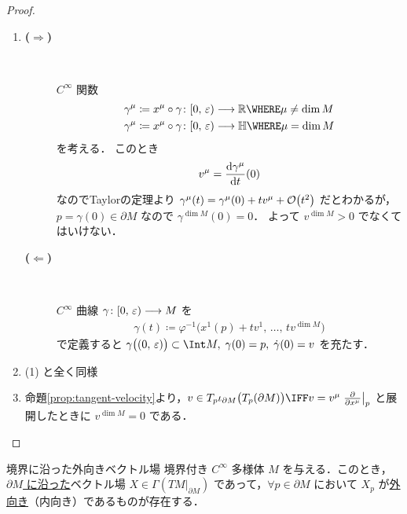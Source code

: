 \documentclass[geometry_main]{subfiles}
\begin{document}
\begin{proof}
	\begin{enumerate}
		\item 
		\begin{description}
			\item[\textbf{($\bm{\Longrightarrow}$)}]　
			
			$C^\infty$ 関数
			\begin{align}
				\gamma^\mu &\coloneqq x^\mu \circ \gamma \colon [0,\, \varepsilon) \lto \mathbb{R} \WHERE \mu \neq \dim M \\
				\gamma^\mu &\coloneqq x^\mu \circ \gamma \colon [0,\, \varepsilon) \lto \mathbb{H} \WHERE \mu = \dim M
			\end{align}
			を考える．
			このとき
			\begin{align}
				v^{\mu} = \dv{\gamma^{\mu}}{t}()(0)
			\end{align}
			なのでTaylorの定理より $\gamma^\mu(t) = \gamma^\mu (0) + tv^\mu + \order{t^2}$ だとわかるが，$p = \gamma(0)\in \partial M$ なので $\gamma^{\dim M}(0) = 0$．
			よって $v^{\dim M} > 0$ でなくてはいけない．

			\item[\textbf{($\bm{\Longleftarrow}$)}]　
			
			$C^\infty$ 曲線 $\gamma \colon [0,\, \varepsilon) \longrightarrow M$ を
			\begin{align}
				\gamma(t) \coloneqq \varphi^{-1} \bigl( x^1(p) + tv^1,\, \dots,\, tv^{\dim M} \bigr) 
			\end{align}
			で定義すると $\gamma \bigl( (0,\, \varepsilon) \bigr) \subset \Int M,\; \gamma(0) = p,\; \dot{\gamma}(0) = v$ を充たす．
		\end{description}

		\item (1) と全く同様
		
		\item 
		命題\ref{prop:tangent-velocity}より，$v \in T_p \iota_{\partial M} \bigl( T_p (\partial M) \bigr) \IFF v = v^\mu \eval{\pdv{x^\mu}}_p$ と展開したときに $v^{\dim M} = 0$ である．
	\end{enumerate}
	
\end{proof}

\begin{myprop}[label=prop:outward-vecf]{境界に沿った外向きベクトル場}
	境界付き $C^\infty$ 多様体 $M$ を与える．このとき，\hyperref[def:vecf-along]{$\partial M$ に沿った}ベクトル場 $X \in \Gamma(TM|_{\partial M})$ であって，$\forall p \in \partial M$ において $X_p$ が\hyperref[def:inward-pointing]{外向き}（内向き）であるものが存在する．
\end{myprop}
\end{document}

